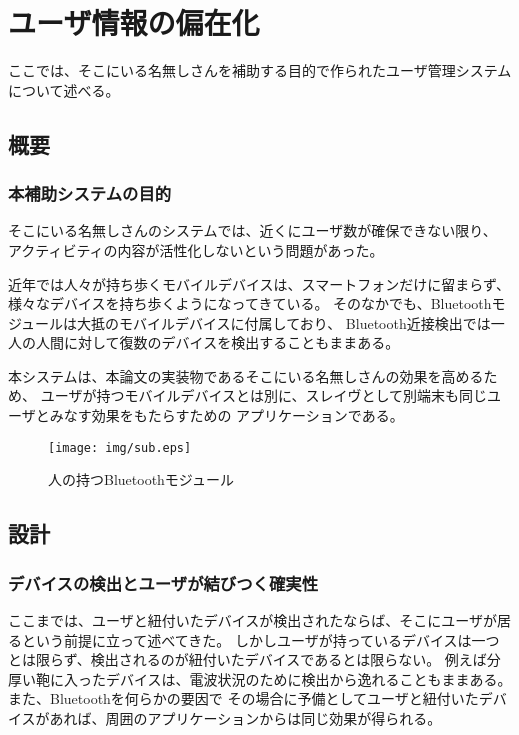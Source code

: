 \chapter{ユーザ情報の偏在化}\label{chap:implementation_2}

ここでは、そこにいる名無しさんを補助する目的で作られたユーザ管理システムについて述べる。

\newpage

\section{概要}

\subsection{本補助システムの目的}

そこにいる名無しさんのシステムでは、近くにユーザ数が確保できない限り、
アクティビティの内容が活性化しないという問題があった。

近年では人々が持ち歩くモバイルデバイスは、スマートフォンだけに留まらず、様々なデバイスを持ち歩くようになってきている。
そのなかでも、Bluetoothモジュールは大抵のモバイルデバイスに付属しており、
Bluetooth近接検出では一人の人間に対して復数のデバイスを検出することもままある。

本システムは、本論文の実装物であるそこにいる名無しさんの効果を高めるため、
ユーザが持つモバイルデバイスとは別に、スレイヴとして別端末も同じユーザとみなす効果をもたらすための
アプリケーションである。

\begin{figure}[b]
  \begin{center}
    \texttt{[image: img/sub.eps]}
  \end{center}
  \caption{人の持つBluetoothモジュール}
  \label{fig:sub}
\end{figure}

\newpage

\section{設計}

\subsection{デバイスの検出とユーザが結びつく確実性}

ここまでは、ユーザと紐付いたデバイスが検出されたならば、そこにユーザが居るという前提に立って述べてきた。
しかしユーザが持っているデバイスは一つとは限らず、検出されるのが紐付いたデバイスであるとは限らない。
例えば分厚い鞄に入ったデバイスは、電波状況のために検出から逸れることもままある。
また、Bluetoothを何らかの要因で
その場合に予備としてユーザと紐付いたデバイスがあれば、周囲のアプリケーションからは同じ効果が得られる。


